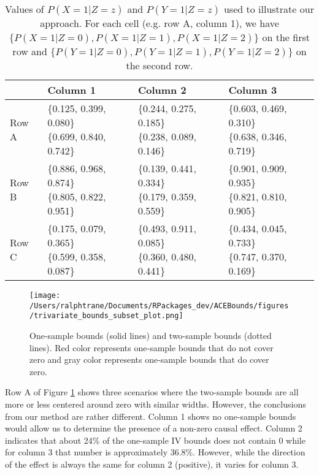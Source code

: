 \documentclass[
]{article}
\theoremstyle{plain}
\begin{document}
\begin{table}[H]
  \center
  \caption{Values of $P(X = 1 | Z = z)$ and $P(Y = 1 | Z = z)$ used to illustrate our approach. For each cell (e.g. row A, column 1), we have $\{P(X = 1 | Z = 0), P(X = 1 | Z = 1), P(X = 1 | Z = 2)\}$ on the first row and $\{P(Y = 1 | Z = 0), P(Y = 1 | Z = 1), P(Y = 1 | Z = 2)\}$ on the second row.}
  \label{tab:subset_plot_summaries_b}
  
\begin{tabular}{llll}
\toprule
  & Column 1 & Column 2 & Column 3\\
\midrule
Row A & \makecell[l]{\{0.125, 0.399, 0.080\}\\\{0.699, 0.840, 0.742\}} & \makecell[c]{\{0.244, 0.275, 0.185\}\\\{0.238, 0.089, 0.146\}} & \makecell[r]{\{0.603, 0.469, 0.310\}\\\{0.638, 0.346, 0.719\}}\\
Row B & \makecell[l]{\{0.886, 0.968, 0.874\}\\\{0.805, 0.822, 0.951\}} & \makecell[c]{\{0.139, 0.441, 0.334\}\\\{0.179, 0.359, 0.559\}} & \makecell[r]{\{0.901, 0.909, 0.935\}\\\{0.821, 0.810, 0.905\}}\\
Row C & \makecell[l]{\{0.175, 0.079, 0.365\}\\\{0.599, 0.358, 0.087\}} & \makecell[c]{\{0.493, 0.911, 0.085\}\\\{0.360, 0.480, 0.441\}} & \makecell[r]{\{0.434, 0.045, 0.733\}\\\{0.747, 0.370, 0.169\}}\\
\bottomrule
\end{tabular}


\end{table}

\begin{figure}[H]
  \center
  \texttt{[image: /Users/ralphtrane/Documents/RPackages\_dev/ACEBounds/figures/trivariate\_bounds\_subset\_plot.png]}
  \caption{One-sample bounds (solid lines) and two-sample bounds (dotted lines). Red color represents one-sample bounds that do not cover zero and gray color represents one-sample bounds that do cover zero.}
  \label{fig:trivariate_bounds}
\end{figure}

Row A of Figure \ref{fig:trivariate_bounds} shows three scenarios where the two-sample bounds are all more or less centered around zero with similar widths. However, the conclusions from our method are rather different. Column 1 shows no one-sample bounds would allow us to determine the presence of a non-zero causal effect. Column 2 indicates that about 24\% of the one-sample IV bounds does not contain \(0\) while for column 3 that number is approximately 36.8\%. However, while the direction of the effect is always the same for column 2 (positive), it varies for column 3.
\end{document}
